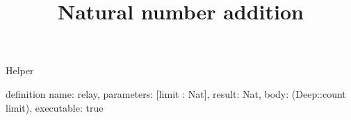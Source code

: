 \begin{lexlean}{Helper}
\title{Natural number addition}
\begin{semanticmodule}
definition{
  name: relay,
  parameters: [limit : Nat],
  result: Nat,
  body: (Deep::count limit),
  executable: true
}
\end{semanticmodule}
\end{lexlean}
